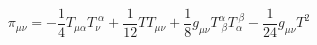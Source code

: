 \begin{equation}
\pi_{\mu\nu} = -\frac{1}{4}T_{\mu\alpha}T^{\;\alpha}_{\nu} +\frac{1}{12}TT_{\mu\nu} 
+\frac{1}{8}g_{\mu\nu}T^{\alpha}_{\;\beta} T^{\;\beta}_{\alpha}-\frac{1}{24}g_{\mu\nu}T^2
\end{equation}

